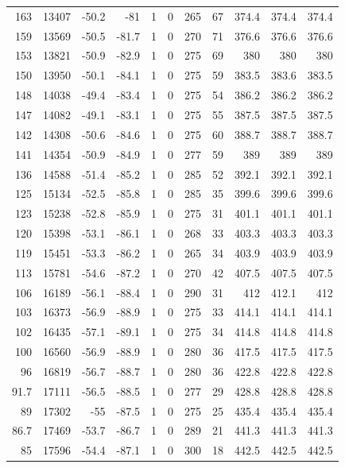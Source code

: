\documentclass{article}
\begin{document}
\begin{longtable}{|r|r|r|r|r|r|r|r|r|r|r}
163 & 13407 & -50.2 & -81 & 1 & 0 & 265 & 67 & 374.4 & 374.4 & 374.4 \\
159 & 13569 & -50.5 & -81.7 & 1 & 0 & 270 & 71 & 376.6 & 376.6 & 376.6 \\
153 & 13821 & -50.9 & -82.9 & 1 & 0 & 275 & 69 & 380 & 380 & 380 \\
150 & 13950 & -50.1 & -84.1 & 1 & 0 & 275 & 59 & 383.5 & 383.6 & 383.5 \\
148 & 14038 & -49.4 & -83.4 & 1 & 0 & 275 & 54 & 386.2 & 386.2 & 386.2 \\
147 & 14082 & -49.1 & -83.1 & 1 & 0 & 275 & 55 & 387.5 & 387.5 & 387.5 \\
142 & 14308 & -50.6 & -84.6 & 1 & 0 & 275 & 60 & 388.7 & 388.7 & 388.7 \\
141 & 14354 & -50.9 & -84.9 & 1 & 0 & 277 & 59 & 389 & 389 & 389 \\
136 & 14588 & -51.4 & -85.2 & 1 & 0 & 285 & 52 & 392.1 & 392.1 & 392.1 \\
125 & 15134 & -52.5 & -85.8 & 1 & 0 & 285 & 35 & 399.6 & 399.6 & 399.6 \\
123 & 15238 & -52.8 & -85.9 & 1 & 0 & 275 & 31 & 401.1 & 401.1 & 401.1 \\
120 & 15398 & -53.1 & -86.1 & 1 & 0 & 268 & 33 & 403.3 & 403.3 & 403.3 \\
119 & 15451 & -53.3 & -86.2 & 1 & 0 & 265 & 34 & 403.9 & 403.9 & 403.9 \\
113 & 15781 & -54.6 & -87.2 & 1 & 0 & 270 & 42 & 407.5 & 407.5 & 407.5 \\
106 & 16189 & -56.1 & -88.4 & 1 & 0 & 290 & 31 & 412 & 412.1 & 412 \\
103 & 16373 & -56.9 & -88.9 & 1 & 0 & 275 & 33 & 414.1 & 414.1 & 414.1 \\
102 & 16435 & -57.1 & -89.1 & 1 & 0 & 275 & 34 & 414.8 & 414.8 & 414.8 \\
100 & 16560 & -56.9 & -88.9 & 1 & 0 & 280 & 36 & 417.5 & 417.5 & 417.5 \\
96 & 16819 & -56.7 & -88.7 & 1 & 0 & 280 & 36 & 422.8 & 422.8 & 422.8 \\
91.7 & 17111 & -56.5 & -88.5 & 1 & 0 & 277 & 29 & 428.8 & 428.8 & 428.8 \\
89 & 17302 & -55 & -87.5 & 1 & 0 & 275 & 25 & 435.4 & 435.4 & 435.4 \\
86.7 & 17469 & -53.7 & -86.7 & 1 & 0 & 289 & 21 & 441.3 & 441.3 & 441.3 \\
85 & 17596 & -54.4 & -87.1 & 1 & 0 & 300 & 18 & 442.5 & 442.5 & 442.5 \\

\end{longtable}
\end{document}
